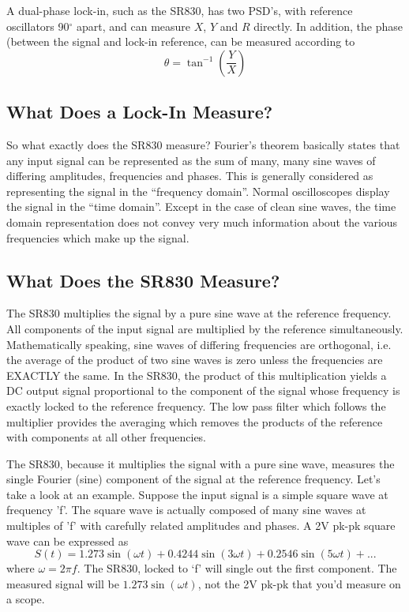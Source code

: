\documentclass{../lab}
\begin{document}
A dual-phase lock-in, such as the SR830, has two PSD's, with reference oscillators 90$^\circ$ apart, and can measure $X$, $Y$ and $R$ directly. In addition, the phase (between the signal and lock-in reference, can be measured according to
\[
    \theta = \tan^{-1} \left(\frac{Y}{X} \right)
\]

\subsection{What Does a Lock-In Measure?}

So what exactly does the SR830 measure? Fourier's theorem basically states that any input signal can be represented as the sum of many, many sine waves of differing amplitudes, frequencies and phases. This is generally considered as representing the signal in the ``frequency domain''. Normal oscilloscopes display the signal in the ``time domain''. Except in the case of clean sine waves, the time domain representation does not convey very much information about the various frequencies which make up the signal.

\subsection{What Does the SR830 Measure?}

The SR830 multiplies the signal by a pure sine wave at the reference frequency. All components of the input signal are multiplied by the reference simultaneously. Mathematically speaking, sine waves of differing frequencies are orthogonal, i.e. the average of the product of two sine waves is zero unless the frequencies are EXACTLY the same. In the SR830, the product of this multiplication yields a DC output signal proportional to the component of the signal whose frequency is exactly locked to the reference frequency. The low pass filter which follows the multiplier provides the averaging which removes the products of the reference with components at all other frequencies.

The SR830, because it multiplies the signal with a pure sine wave, measures the single Fourier (sine) component of the signal at the reference frequency. Let's take a look at an example. Suppose the input signal is a simple square wave at frequency 'f'. The square wave is actually composed of many sine waves at multiples of 'f' with carefully related amplitudes and phases. A 2V pk-pk square wave can be expressed as
\[
    S(t) = 1.273 \sin(\omega t) + 0.4244 \sin(3 \omega t) + 0.2546 \sin(5 \omega t) + ...
\]
where $\omega = 2 \pi f$. The SR830, locked to `f' will single out the first component. The measured signal will be $1.273 \sin(\omega t)$, not the 2V pk-pk that you'd measure on a scope.
\end{document}
